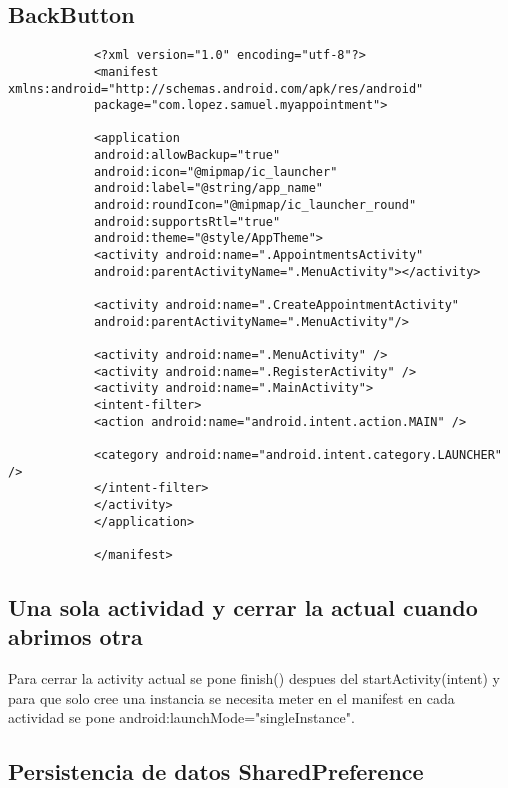 \documentclass[a4paper]{article}
\begin{document}
		\subsection{BackButton}
		
		\begin{lstlisting}
			<?xml version="1.0" encoding="utf-8"?>
			<manifest xmlns:android="http://schemas.android.com/apk/res/android"
			package="com.lopez.samuel.myappointment">
			
			<application
			android:allowBackup="true"
			android:icon="@mipmap/ic_launcher"
			android:label="@string/app_name"
			android:roundIcon="@mipmap/ic_launcher_round"
			android:supportsRtl="true"
			android:theme="@style/AppTheme">
			<activity android:name=".AppointmentsActivity"
			android:parentActivityName=".MenuActivity"></activity>
			
			<activity android:name=".CreateAppointmentActivity"
			android:parentActivityName=".MenuActivity"/>
			
			<activity android:name=".MenuActivity" />
			<activity android:name=".RegisterActivity" />
			<activity android:name=".MainActivity">
			<intent-filter>
			<action android:name="android.intent.action.MAIN" />
			
			<category android:name="android.intent.category.LAUNCHER" />
			</intent-filter>
			</activity>
			</application>
			
			</manifest>
		\end{lstlisting}
	
		
		\subsection{Una sola actividad y cerrar la actual cuando abrimos otra }
		
		Para cerrar la activity actual se pone finish() despues del startActivity(intent) y para que solo cree una instancia se necesita meter en el manifest en cada actividad se pone android:launchMode="singleInstance".
		
		\subsection{Persistencia de datos SharedPreference}
		
\end{document}
